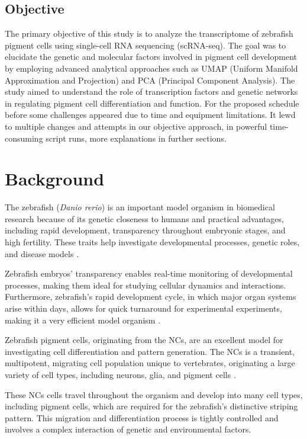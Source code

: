 \documentclass[runningheads]{llncs}
\begin{document}
\subsection*{Objective}
The primary objective of this study is to analyze the transcriptome of zebrafish pigment cells using single-cell RNA sequencing (scRNA-seq). The goal was to elucidate the genetic and molecular factors involved in pigment cell development by employing advanced analytical approaches such as UMAP (Uniform Manifold Approximation and Projection) and PCA (Principal Component Analysis). The study aimed to understand the role of transcription factors and genetic networks in regulating pigment cell differentiation and function. For the proposed schedule before some challenges appeared due to time and equipment limitations. It lewd to multiple changes and attempts in our objective approach, in powerful time-consuming script runs, more explanations in further sections.

\section{Background} 
The zebrafish (\textit{Danio rerio}) is an important model organism in biomedical research because of its genetic closeness to humans and practical advantages, including rapid development, transparency throughout embryonic stages, and high fertility. These traits help investigate developmental processes, genetic roles, and disease models \cite{howard2021atlas}.

Zebrafish embryos' transparency enables real-time monitoring of developmental processes, making them ideal for studying cellular dynamics and interactions. Furthermore, zebrafish's rapid development cycle, in which major organ systems arise within days, allows for quick turnaround for experimental experiments, making it a very efficient model organism \cite{patterson2019zebrafish,lencer2021single}.

Zebrafish pigment cells, originating from the NCs, are an excellent model for investigating cell differentiation and pattern generation. The NCs is a transient, multipotent, migrating cell population unique to vertebrates, originating a large variety of cell types, including neurons, glia, and pigment cells \cite{subkhankulova2023zebrafish}. 

These NCs cells travel throughout the organism and develop into many cell types, including pigment cells, which are required for the zebrafish's distinctive striping pattern. This migration and differentiation process is tightly controlled and involves a complex interaction of genetic and environmental factors\cite{patterson2019zebrafish}.
\end{document}
